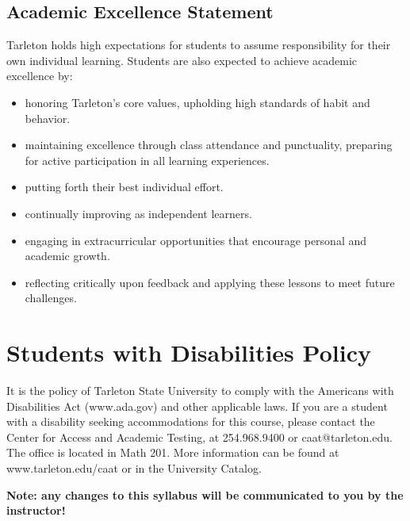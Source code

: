 \documentclass[10pt]{article}
\begin{document}
\subsection*{Academic Excellence Statement}
\label{sec:org618c998}
Tarleton holds high expectations for students to assume responsibility for their own individual learning. Students are also expected to achieve academic excellence by:
\begin{itemize}
\item honoring Tarleton’s core values, upholding high standards of habit and behavior.
\item maintaining excellence through class attendance and punctuality, preparing for active participation in all learning experiences.
\item putting forth their best individual effort.
\item continually improving as independent learners.
\item engaging in extracurricular opportunities that encourage personal and academic growth.
\item reflecting critically upon feedback and applying these lessons to meet future challenges.
\end{itemize}

\section*{Students with Disabilities Policy}
\label{sec:orgf5331b4}

It is the policy of Tarleton State University to comply with the Americans with Disabilities  Act (www.ada.gov) and other applicable laws.  If you are a student with a disability seeking accommodations for this course, please contact the Center for Access and Academic Testing, at 254.968.9400 or caat@tarleton.edu. The office is located in Math 201. More information can be found at www.tarleton.edu/caat or in the University Catalog.​

\textbf{Note:  any changes to this syllabus will be communicated to you by the instructor!}

\newpage
\end{document}
